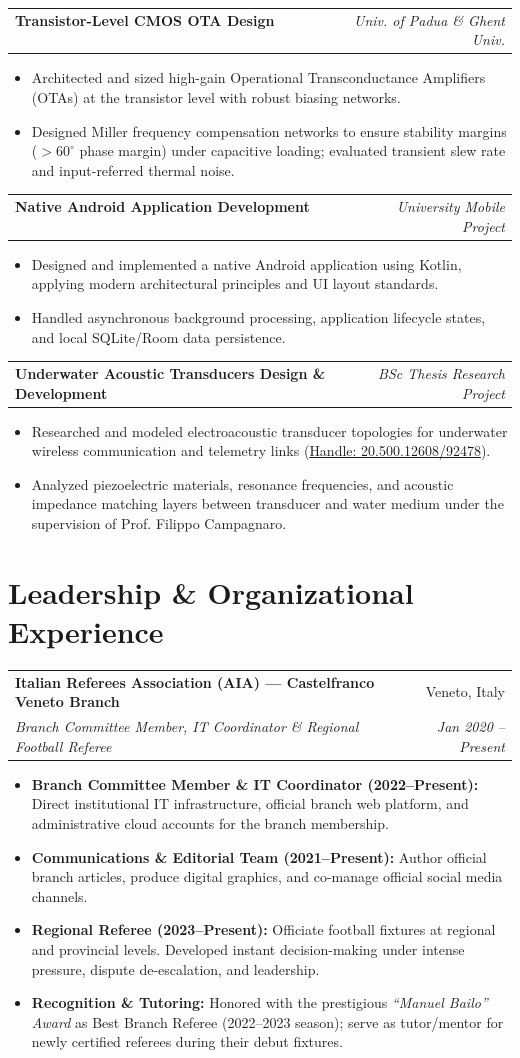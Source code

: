 \documentclass[10pt,a4paper]{article}
\makeatletter
\newcommand{\resumeItem}[1]{%
  \item\small{#1}%
}
\newcommand{\resumeSubheading}[4]{%
  \vspace{1.5pt}
  \noindent\begin{tabular*}{\textwidth}[t]{@{}l@{\extracolsep{\fill}}r@{}}
    \textbf{#1} & \textcolor{secondary}{\small #2} \\
    \textit{\small #3} & \textcolor{secondary}{\textit{\small #4}} \\
  \end{tabular*}\vspace{-2pt}
}
\newcommand{\resumeProjectHeading}[2]{%
  \vspace{1.5pt}
  \noindent\begin{tabular*}{\textwidth}[t]{@{}l@{\extracolsep{\fill}}r@{}}
    \textbf{#1} & \textcolor{secondary}{\textit{\small #2}} \\
  \end{tabular*}\vspace{-2pt}
}
\newcommand{\resumeItemListStart}{\begin{itemize}[leftmargin=1.15em, itemsep=2.2pt, topsep=1.5pt, parsep=0pt]}
\newcommand{\resumeItemListEnd}{\end{itemize}\vspace{2pt}}
\makeatother
\begin{document}
\resumeProjectHeading
  {\textbf{Transistor-Level CMOS OTA Design} \ \textbar\ \ \normalfont{\textit{Cadence Virtuoso, SPICE}}}{Univ. of Padua \& Ghent Univ.}
  \resumeItemListStart
    \resumeItem{Architected and sized high-gain Operational Transconductance Amplifiers (OTAs) at the transistor level with robust biasing networks.}
    \resumeItem{Designed Miller frequency compensation networks to ensure stability margins ($>60^\circ$ phase margin) under capacitive loading; evaluated transient slew rate and input-referred thermal noise.}
  \resumeItemListEnd

\resumeProjectHeading
  {\textbf{Native Android Application Development} \ \textbar\ \ \normalfont{\textit{Kotlin, Android Studio}}}{University Mobile Project}
  \resumeItemListStart
    \resumeItem{Designed and implemented a native Android application using Kotlin, applying modern architectural principles and UI layout standards.}
    \resumeItem{Handled asynchronous background processing, application lifecycle states, and local SQLite/Room data persistence.}
  \resumeItemListEnd

\resumeProjectHeading
  {\textbf{Underwater Acoustic Transducers Design \& Development} \ \textbar\ \ \normalfont{\textit{Electroacoustics, Simulation}}}{BSc Thesis Research Project}
  \resumeItemListStart
    \resumeItem{Researched and modeled electroacoustic transducer topologies for underwater wireless communication and telemetry links (\href{https://hdl.handle.net/20.500.12608/92478}{Handle: 20.500.12608/92478}).}
    \resumeItem{Analyzed piezoelectric materials, resonance frequencies, and acoustic impedance matching layers between transducer and water medium under the supervision of Prof. Filippo Campagnaro.}
  \resumeItemListEnd

\section{Leadership \& Organizational Experience}

\resumeSubheading
  {Italian Referees Association (AIA) --- Castelfranco Veneto Branch}{Veneto, Italy}
  {Branch Committee Member, IT Coordinator \& Regional Football Referee}{Jan 2020 -- Present}
  \resumeItemListStart
    \resumeItem{\textbf{Branch Committee Member \& IT Coordinator (2022--Present):} Direct institutional IT infrastructure, official branch web platform, and administrative cloud accounts for the branch membership.}
    \resumeItem{\textbf{Communications \& Editorial Team (2021--Present):} Author official branch articles, produce digital graphics, and co-manage official social media channels.}
    \resumeItem{\textbf{Regional Referee (2023--Present):} Officiate football fixtures at regional and provincial levels. Developed instant decision-making under intense pressure, dispute de-escalation, and leadership.}
    \resumeItem{\textbf{Recognition \& Tutoring:} Honored with the prestigious \textit{``Manuel Bailo'' Award} as Best Branch Referee (2022--2023 season); serve as tutor/mentor for newly certified referees during their debut fixtures.}
  \resumeItemListEnd
\end{document}
